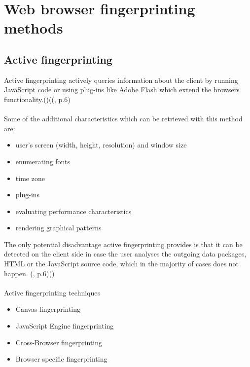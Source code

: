 \section{Web browser fingerprinting methods}\label{sec:Methods}
\subsection{Active fingerprinting}
Active fingerprinting actively queries information about the client by running JavaScript code or using plug-ins like Adobe Flash which extend the browsers functionality.(\textcite{web17})((\textcite{doty18}, p.6)\\\\
Some of the additional characteristics which can be retrieved with this method are:
\begin{itemize}
	\item user's screen (width, height, resolution) and window size
	\item enumerating fonts
	\item time zone
	\item plug-ins
	\item evaluating performance characteristics
	\item rendering graphical patterns\\
\end{itemize}
The only potential disadvantage active fingerprinting provides is that it  can be detected on the client side in case the user analyses the outgoing data packages, HTML or the JavaScript source code, which in the majority of cases does not happen. (\textcite{doty18}, p.6)(\textcite{web17})\\\\
Active fingerprinting techniques
\begin{itemize}
	\item Canvas fingerprinting
	\item JavaScript Engine fingerprinting
	\item Cross-Browser fingerprinting
	\item Browser specific fingerprinting
\end{itemize}

